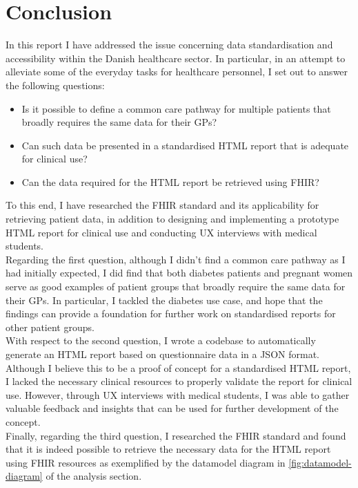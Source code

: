 \section{Conclusion}
In this report I have addressed the issue concerning data standardisation and accessibility within the Danish healthcare sector. In particular, in an attempt to alleviate some of the everyday tasks for healthcare personnel, I set out to answer the following questions:
\begin{itemize}
    \item Is it possible to define a common care pathway for multiple patients that broadly requires the same data for their GPs?
    \item Can such data be presented in a standardised HTML report that is adequate for clinical use?
    \item Can the data required for the HTML report be retrieved using FHIR?
\end{itemize} 
To this end, I have researched the FHIR standard and its applicability for retrieving patient data, in addition to designing and implementing a prototype HTML report for clinical use and conducting UX interviews with medical students.
\\
Regarding the first question, although I didn't find a common care pathway as I had initially expected, I did find that both diabetes patients and pregnant women serve as good examples of patient groups that broadly require the same data for their GPs. In particular, I tackled the diabetes use case, and hope that the findings can provide a foundation for further work on standardised reports for other patient groups.
\\
With respect to the second question, I wrote a codebase to automatically generate an HTML report based on questionnaire data in a JSON format. Although I believe this to be a proof of concept for a standardised HTML report, I lacked the necessary clinical resources to properly validate the report for clinical use. However, through UX interviews with medical students, I was able to gather valuable feedback and insights that can be used for further development of the concept.
\\
Finally, regarding the third question, I researched the FHIR standard and found that it is indeed possible to retrieve the necessary data for the HTML report using FHIR resources as exemplified by the datamodel diagram in \autoref{fig:datamodel-diagram} of the analysis section.
